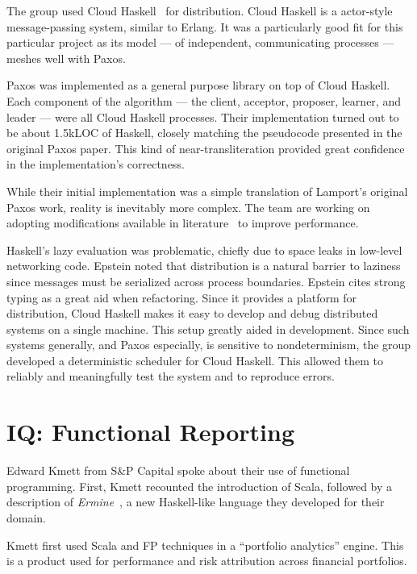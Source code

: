 \documentclass{jfp1}
\begin{document}
The group used Cloud Haskell~\cite{Epstein:2011:Towards} for
distribution. Cloud Haskell is a actor-style message-passing system,
similar to Erlang. It was a particularly good fit for this particular
project as its model --- of independent, communicating processes ---
meshes well with Paxos.

Paxos was implemented as a general purpose library on top of Cloud
Haskell. Each component of the algorithm --- the client, acceptor,
proposer, learner, and leader --- were all Cloud Haskell processes.
Their implementation turned out to be about 1.5kLOC of Haskell,
closely matching the pseudocode presented in the original Paxos paper.
This kind of near-transliteration provided great confidence in the
implementation's correctness.

While their initial implementation was a simple translation of
Lamport's original Paxos work, reality is inevitably more
complex. The team are working on adopting modifications available
in literature~\cite{Chandra:2007:Paxos} to improve performance.

Haskell's lazy evaluation was problematic, chiefly due to space leaks
in low-level networking code. Epstein noted that distribution is a
natural barrier to laziness since messages must be serialized across
process boundaries. Epstein cites strong typing as a great aid when
refactoring. Since it provides a platform for distribution, Cloud
Haskell makes it easy to develop and debug distributed systems on a
single machine. This setup greatly aided in development. Since such
systems generally, and Paxos especially, is sensitive to
nondeterminism, the group developed a deterministic scheduler for
Cloud Haskell. This allowed them to reliably and meaningfully test the
system and to reproduce errors.

\section{IQ: Functional Reporting}


Edward Kmett from S\&P Capital spoke about their use of functional
programming. First, Kmett recounted the introduction of Scala,
followed by a description of
\textit{Ermine}~\cite{Compall:2014:Ermine}, a new Haskell-like
language they developed for their domain.

Kmett first used Scala and FP techniques in a ``portfolio analytics''
engine. This is a product used for performance and risk attribution
across financial portfolios.
\end{document}
